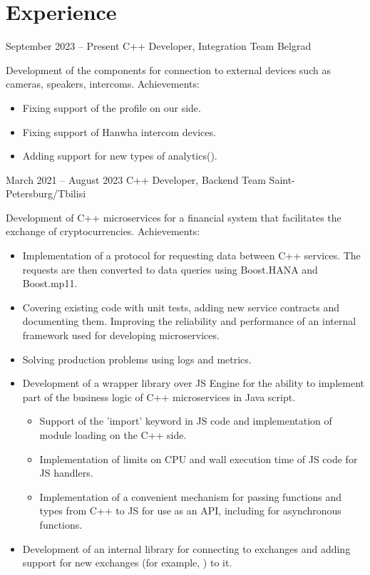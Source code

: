 \documentclass[11pt,a4paper,sans]{moderncv}
\begin{document}
\makecvtitle

\section{Experience}
\cventry
{September 2023 -- Present}
{C++ Developer, Integration Team}
{}
{Belgrad}
{}
{Development of the components for connection to external devices such as cameras, speakers, intercoms.\newline{}
Achievements:
\begin{itemize}
\item Fixing support of the  profile on our side.
\item Fixing support of Hanwha intercom devices.
\item Adding support for new types of analytics().
\end{itemize}}

\cventry
{March 2021 -- August 2023}
{C++ Developer, Backend Team}
{}
{Saint-Petersburg/Tbilisi}
{}
{Development of C++ microservices for a financial system that facilitates the exchange of cryptocurrencies.\newline{}
Achievements:
\begin{itemize}
\item Implementation of a protocol for requesting data between C++ services. The requests are then converted to data queries using Boost.HANA and Boost.mp11.
\item Covering existing code with unit tests, adding new service contracts and documenting them. Improving the reliability and performance of an internal framework used for developing microservices.
\item Solving production problems using logs and metrics.
\item Development of a wrapper library over  JS Engine for the ability to implement part of the business logic of C++ microservices in Java script.
  \begin{itemize}
  \item Support of the 'import' keyword in JS code and implementation of module loading on the C++ side.
  \item Implementation of limits on CPU and wall execution time of JS code for JS handlers.
  \item Implementation of a convenient mechanism for passing functions and types from C++ to JS for use as an API, including for asynchronous functions.
  \end{itemize}
\item Development of an internal library for connecting to exchanges and adding support for new exchanges (for example, ) to it.
\end{itemize}}
\end{document}
